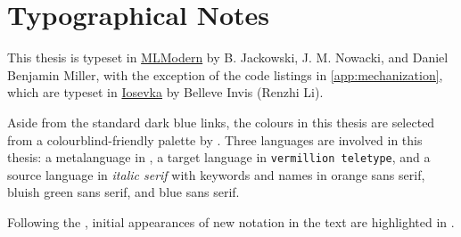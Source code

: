 \chapter{Typographical Notes}

This thesis is typeset in \href{https://tug.org/FontCatalogue/mlmodern/}{MLModern} by B. Jackowski, J. M. Nowacki, and Daniel Benjamin Miller,
with the exception of the code listings in \cref{app:mechanization},
which are typeset in \href{https://typeof.net/Iosevka/}{\codefont Iosevka} by Belleve Invis (Renzhi Li).

Aside from the standard dark blue links,
the colours in this thesis are selected from a colourblind-friendly palette by \citet{palette}.
Three languages are involved in this thesis:
a metalanguage in ,
a target language in \textcolor{targetcolour}{\texttt{vermillion teletype}},
and a source language in \textit{italic serif} with keywords and names in
\textcolor{kwcolour}{\textsf{orange sans serif}},
\textcolor{constrcolour}{\textsf{bluish green sans serif}},
and \textcolor{constcolour}{\textsf{blue sans serif}}.

Following the ,
initial appearances of new notation in the text are highlighted in .
